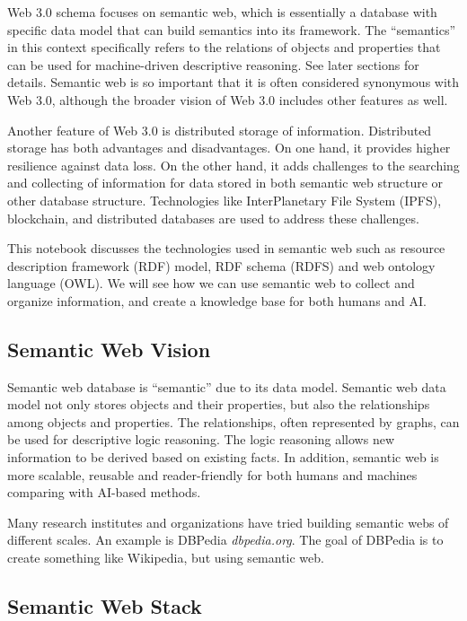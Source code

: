 Web 3.0 schema focuses on semantic web, which is essentially a database with specific data model that can build semantics into its framework. The ``semantics'' in this context specifically refers to the relations of objects and properties that can be used for machine-driven descriptive reasoning. See later sections for details. Semantic web is so important that it is often considered synonymous with Web 3.0, although the broader vision of Web 3.0 includes other features as well.

Another feature of Web 3.0 is distributed storage of information. Distributed storage has both advantages and disadvantages. On one hand, it provides higher resilience against data loss. On the other hand, it adds challenges to the searching and collecting of information for data stored in both semantic web structure or other database structure. Technologies like InterPlanetary File System (IPFS), blockchain, and distributed databases are used to address these challenges.

This notebook discusses the technologies used in semantic web such as resource description framework (RDF) model, RDF schema (RDFS) and web ontology language (OWL). We will see how we can use semantic web to collect and organize information, and create a knowledge base for both humans and AI.

\subsection{Semantic Web Vision}

Semantic web database is ``semantic'' due to its data model. Semantic web data model not only stores objects and their properties, but also the relationships among objects and properties. The relationships, often represented by graphs, can be used for descriptive logic reasoning. The logic reasoning allows new information to be derived based on existing facts. In addition, semantic web is more scalable, reusable and reader-friendly for both humans and machines comparing with AI-based methods.

Many research institutes and organizations have tried building semantic webs of different scales. An example is DBPedia \textit{dbpedia.org}. The goal of DBPedia is to create something like Wikipedia, but using semantic web.

\subsection{Semantic Web Stack} \label{subsec:semanticwebstack}

